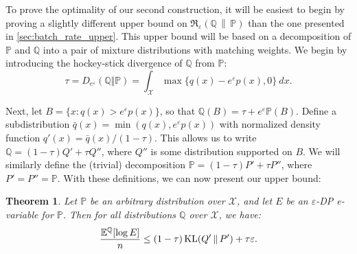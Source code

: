 \documentclass{article}
\DeclareMathOperator{\KLop}{KL}
\newcommand{\KL}[2]{%
  \mathchoice
    {\KLop\!\left(#1\,\middle\|\,#2\right)}%
    {\KLop(#1\,\Vert\,#2)}%
    {\KLop(#1\,\Vert\,#2)}%
    {\KLop(#1\,\Vert\,#2)}%
}
\newcommand{\Rdiv}[3][\eps]{%
  \mathfrak{R}_{#1}\!\left(#2\,\middle\|\,#3\right)%
}
\newcommand{\Null}{\mathbb{P}}
\newcommand{\Alt}{\mathbb{Q}}
\newcommand{\opt}{\Rdiv{\Alt}{\Null}}
\newcommand{\eps}{\varepsilon}
\newtheorem{theorem}{Theorem}[section]
\begin{document}
To prove the optimality of our second construction, it will be easiest to begin by proving a slightly different upper bound on $\opt$ than the one presented in \cref{sec:batch_rate_upper}.
This upper bound will be based on a decomposition of $\Null$ and $\Alt$ into a pair of mixture distributions with matching weights. We begin by introducing the hockey-stick divergence of $\Alt$ from $\Null$:
\begin{equation*}
    \tau = D_{e^\varepsilon}(\Alt \Vert \Null) =\int_\mathcal{X} 
      \max \lbrace q(x)-e^\varepsilon p(x), 0 \rbrace ~dx.
\end{equation*}

Next, let $B = \lbrace x : q(x) > e^\varepsilon p(x)\rbrace$, so that $\Alt(B) = \tau + e^\varepsilon \Null(B)$. Define a subdistribution $\bar q(x) = \min(q(x), e^\varepsilon p(x))$ with normalized density function $q'(x) = \bar q(x)/(1-\tau)$. This allows us to write $\Alt = (1-\tau)Q' + \tau Q''$, where $Q''$ is some distribution supported on $B$. We will similarly define the (trivial) decomposition $\Null = (1-\tau)P' + \tau P''$, where $P' = P'' = \Null$. With these definitions, we can now present our upper bound:

\begin{theorem}\label{thm:tslr-ub}
        Let $\Null$ be an arbitrary distribution over $\mathcal{X}$, and let $E$ be an $\eps$-DP e-variable for $\Null$. Then for all distributions $\Alt$ over $\mathcal{X}$, we have:
        \begin{equation*}
            \frac{\mathbb{E}^\Alt[\log E]}{n} \leq (1-\tau)\KL{Q'}{P'} + \tau\varepsilon.
        \end{equation*}
\end{theorem}
\end{document}
